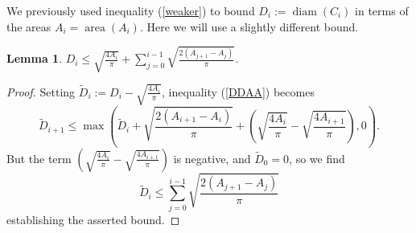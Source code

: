 \documentclass[12pt]{article}
\newtheorem{Lemma}{Lemma}
\newcommand{\sfrac}[2]{{\textstyle\frac{#1}{#2}}}
\DeclareMathOperator{\diam}{diam}
\DeclareMathOperator{\area}{area}
\begin{document}
We previously used inequality (\ref{weaker}) to bound $D_i := \diam(C_i)$ in terms of the areas $A_i = \area(A_i)$. 
Here we will use a slightly different bound. 
\begin{Lemma}
\label{L:DiA}
$D_i \le \sqrt{ \sfrac{ 4 A_{i}}{\pi} } + \sum_{j=0}^{i-1} \sqrt{ \sfrac{2(A_{j+1} - A_j)}{\pi} } $.
\end{Lemma}
\begin{proof}
Setting $\widetilde{D}_i := D_i - \sqrt{ \sfrac{ 4 A_{i}}{\pi} } $, inequality (\ref{DDAA}) becomes
\[ \widetilde{D}_{i+1} \le 
 \max \left( 
\widetilde{D}_i + \sqrt{ \sfrac{2(A_{i+1} - A_i)}{\pi} } 
+ \left(  \sqrt{ \sfrac{ 4 A_{i}}{\pi} } - 
\sqrt{ \sfrac{ 4 A_{i+1}}{\pi} }\right) , 0
 \right) . \]
But the term $ (  \sqrt{ \sfrac{ 4 A_{i}}{\pi} } - 
\sqrt{ \sfrac{ 4 A_{i+1}}{\pi} }) $ is negative, and $\widetilde{D}_0 = 0$, so we find
\[ \widetilde{D}_i \le \sum_{j=0}^{i-1} \sqrt{ \sfrac{2(A_{j+1} - A_j)}{\pi} } \]
establishing the asserted bound.
\end{proof}
\end{document}
